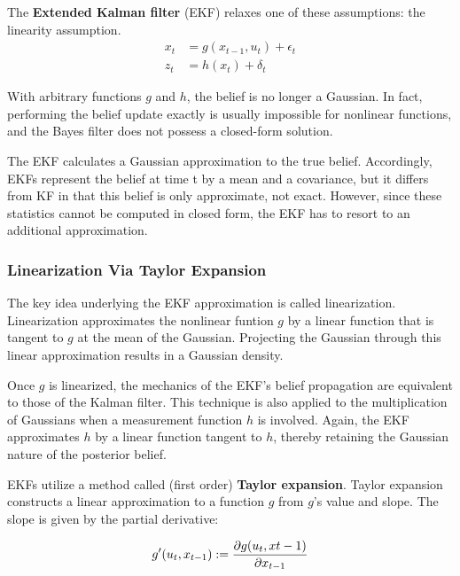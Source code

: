 \documentclass[14pt,letterpaper]{article}
\theoremstyle{definition}
\begin{document}
\vspace{2mm}

The \textbf{Extended Kalman filter} (EKF) relaxes one of these assumptions: the linearity assumption.
\begin{align}
  x_t &= g(x_{t-1}, u_t) + \epsilon_t \\
  z_t &= h(x_t) + \delta_t
\end{align}

With arbitrary functions $g$ and $h$, the belief is no longer a Gaussian.
In fact, performing the belief update exactly is usually impossible for nonlinear functions, and the Bayes filter does not possess a closed-form solution.

The EKF calculates a Gaussian approximation to the true belief.
Accordingly, EKFs represent the belief at time t by a mean and a covariance, but it differs from KF in that this belief is only approximate, not exact.
However, since these statistics cannot be computed in closed form, the EKF has to resort to an additional approximation.

\subsubsection{Linearization Via Taylor Expansion}

The key idea underlying the EKF approximation is called linearization.
Linearization approximates the nonlinear funtion $g$ by a linear function that is tangent to $g$ at the mean of the Gaussian.
Projecting the Gaussian through this linear approximation results in a Gaussian density.

\vspace{2mm}

Once $g$ is linearized, the mechanics of the EKF's belief propagation are equivalent to those of the Kalman filter.
This technique is also applied to the multiplication of Gaussians when a measurement function $h$ is involved.
Again, the EKF approximates $h$ by a linear function tangent to $h$, thereby retaining the Gaussian nature of the posterior belief.

\newpage
EKFs utilize a method called (first order) \textbf{Taylor expansion}.
Taylor expansion constructs a linear approximation to a function $g$ from $g$'s value and slope.
The slope is given by the partial derivative:

\begin{equation}
  g'(u_t, x_{t-1}) := \frac{\partial{g(u_t, x{t-1})}}{\partial{x_{t-1}}} \\
\end{equation}
\end{document}
